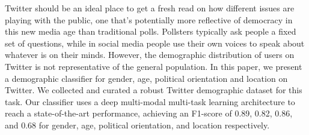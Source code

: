 Twitter should be an ideal place to get a fresh read on how different issues are playing with the public, one that's potentially more reflective of democracy in this new media age than traditional polls. Pollsters typically ask people a fixed set of questions, while in social media people use their own voices to speak about whatever is on their minds. However, the demographic distribution of users on Twitter is not representative of the general population. In this paper, we present a demographic classifier for gender, age, political orientation and location on Twitter. We collected and curated a robust Twitter demographic dataset for this task. Our classifier uses a deep multi-modal multi-task learning architecture to reach a state-of-the-art performance, achieving an F1-score of 0.89, 0.82, 0.86, and 0.68 for gender, age, political orientation, and location respectively.
